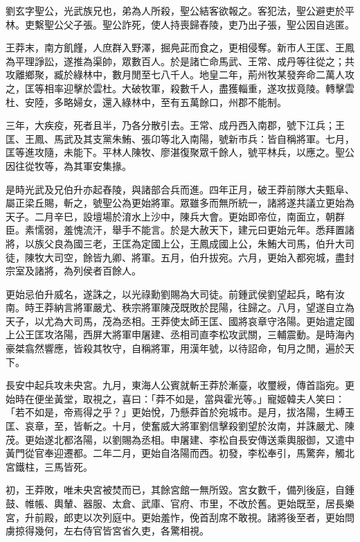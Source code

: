 
\begin{pinyinscope}
劉玄字聖公，光武族兄也，弟為人所殺，聖公結客欲報之。客犯法，聖公避吏於平林。吏繫聖公父子張。聖公詐死，使人持喪歸舂陵，吏乃出子張，聖公因自逃匿。

王莽末，南方飢饉，人庶群入野澤，掘鳧茈而食之，更相侵奪。新市人王匡、王鳳為平理諍訟，遂推為渠帥，眾數百人。於是諸亡命馬武、王常、成丹等往從之；共攻離鄉聚，臧於綠林中，數月閒至七八千人。地皇二年，荊州牧某發奔命二萬人攻之，匡等相率迎擊於雲杜。大破牧軍，殺數千人，盡獲輜重，遂攻拔竟陵。轉擊雲杜、安陸，多略婦女，還入綠林中，至有五萬餘口，州郡不能制。

三年，大疾疫，死者且半，乃各分散引去。王常、成丹西入南郡，號下江兵；王匡、王鳳、馬武及其支黨朱鮪、張卬等北入南陽，號新市兵：皆自稱將軍。七月，匡等進攻隨，未能下。平林人陳牧、廖湛復聚眾千餘人，號平林兵，以應之。聖公因往從牧等，為其軍安集掾。

是時光武及兄伯升亦起舂陵，與諸部合兵而進。四年正月，破王莽前隊大夫甄阜、屬正梁丘賜，斬之，號聖公為更始將軍。眾雖多而無所統一，諸將遂共議立更始為天子。二月辛巳，設壇場於淯水上沙中，陳兵大會。更始即帝位，南面立，朝群臣。素懦弱，羞愧流汗，舉手不能言。於是大赦天下，建元曰更始元年。悉拜置諸將，以族父良為國三老，王匡為定國上公，王鳳成國上公，朱鮪大司馬，伯升大司徒，陳牧大司空，餘皆九卿、將軍。五月，伯升拔宛。六月，更始入都宛城，盡封宗室及諸將，為列侯者百餘人。

更始忌伯升威名，遂誅之，以光祿勳劉賜為大司徒。前鍾武侯劉望起兵，略有汝南。時王莽納言將軍嚴尤、秩宗將軍陳茂既敗於昆陽，往歸之。八月，望遂自立為天子，以尤為大司馬，茂為丞相。王莽使太師王匡、國將哀章守洛陽。更始遣定國上公王匡攻洛陽，西屏大將軍申屠建、丞相司直李松攻武關，三輔震動。是時海內豪桀翕然響應，皆殺其牧守，自稱將軍，用漢年號，以待詔命，旬月之閒，遍於天下。

長安中起兵攻未央宮。九月，東海人公賓就斬王莽於漸臺，收璽綬，傳首詣宛。更始時在便坐黃堂，取視之，喜曰：「莽不如是，當與霍光等。」寵姬韓夫人笑曰：「若不如是，帝焉得之乎？」更始悅，乃懸莽首於宛城市。是月，拔洛陽，生縛王匡、哀章，至，皆斬之。十月，使奮威大將軍劉信擊殺劉望於汝南，并誅嚴尤、陳茂。更始遂北都洛陽，以劉賜為丞相。申屠建、李松自長安傳送乘輿服御，又遣中黃門從官奉迎遷都。二年二月，更始自洛陽而西。初發，李松奉引，馬驚奔，觸北宮鐵柱，三馬皆死。

初，王莽敗，唯未央宮被焚而已，其餘宮館一無所毀。宮女數千，備列後庭，自鍾鼓、帷帳、輿輦、器服、太倉、武庫、官府、市里，不改於舊。更始既至，居長樂宮，升前殿，郎吏以次列庭中。更始羞怍，俛首刮席不敢視。諸將後至者，更始問虜掠得幾何，左右侍官皆宮省久吏，各驚相視。


\end{pinyinscope}
